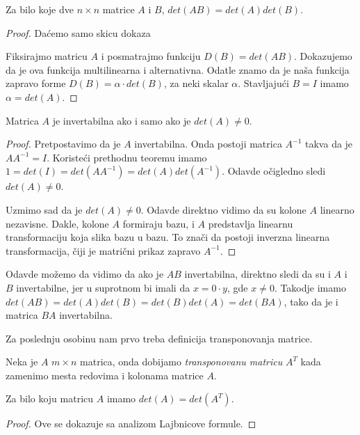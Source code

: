 \documentclass{article}
\begin{document}
\begin{theorem}
  Za bilo koje dve $n \times n$ matrice $A$ i $B$, $det(AB) = det(A)det(B)$.
\end{theorem}

\begin{proof}
  Daćemo samo skicu dokaza

  Fiksirajmo matricu $A$ i posmatrajmo funkciju $D(B) = det(AB)$.
  Dokazujemo da je ova funkcija multilinearna i alternativna.
  Odatle znamo da je naša funkcija zapravo forme $D(B) = \alpha \cdot det(B)$, za neki skalar $\alpha$.
  Stavljajući $B = I$ imamo $\alpha = det(A)$.
\end{proof}

\begin{theorem}
  Matrica $A$ je invertabilna ako i samo ako je $det(A) \neq 0$.
\end{theorem}

\begin{proof}
  Pretpostavimo da je $A$ invertabilna.
  Onda postoji matrica $A^{-1}$ takva da je $AA^{-1} = I$.
  Koristeći prethodnu teoremu imamo $1 = det(I) = det(AA^{-1}) = det(A)det(A^{-1})$.
  Odavde očigledno sledi $det(A) \neq 0$.


  Uzmimo sad da je $det(A) \neq 0$.
  Odavde direktno vidimo da su kolone $A$ linearno nezavisne.
  Dakle, kolone $A$ formiraju bazu, i $A$ predstavlja linearnu transformaciju koja slika bazu u bazu.
  To znači da postoji inverzna linearna transformacija, čiji je matrični prikaz zapravo $A^{-1}$.
\end{proof}

Odavde možemo da vidimo da ako je $AB$ invertabilna, direktno sledi da su i $A$ i $B$ invertabilne, jer u suprotnom bi imali da $x = 0 \cdot y$, gde $x \neq 0$.
Takodje imamo $det(AB) = det(A)det(B) = det(B)det(A) = det(BA)$, tako da je i matrica $BA$ invertabilna.

Za poslednju osobinu nam prvo treba definicija transponovanja matrice.

\begin{definition}
  Neka je $A$ $m \times n$ matrica, onda dobijamo \textit{transponovanu matricu} $A^T$ kada zamenimo mesta redovima i kolonama matrice $A$.
\end{definition}

\begin{theorem}
  Za bilo koju matricu $A$ imamo $det(A) = det(A^T)$.
\end{theorem}

\begin{proof}
  Ove se dokazuje sa analizom Lajbnicove formule.
\end{proof}
\end{document}
